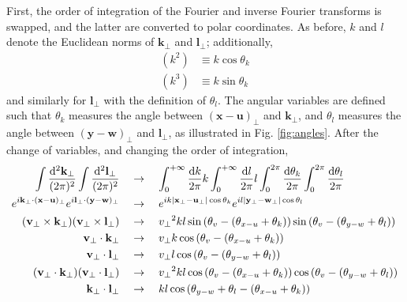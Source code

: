 First, the order of integration of the Fourier and inverse Fourier transforms is swapped, and the latter are converted to polar coordinates. As before, $k$ and $l$ denote the Euclidean norms of $\mathbf{k}_\perp$ and $\mathbf{l}_\perp$; additionally,
\begin{subequations}
\begin{align}
(k^2) & \equiv k \cos \theta_k \\
(k^3) & \equiv k \sin \theta_k
\end{align}
\end{subequations}
and similarly for $\mathbf{l}_\perp$ with the definition of $\theta_l$. The angular variables are defined such that $\theta_k$ measures the angle between $(\mathbf{x}-\mathbf{u})_\perp$ and $\mathbf{k}_\perp$, and $\theta_l$ measures the angle between $(\mathbf{y}-\mathbf{w})_\perp$ and $\mathbf{l}_\perp$, as illustrated in Fig. \ref{fig:angles}. After the change of variables, and changing the order of integration,
\begin{subequations}
\begin{align}
	\int \frac{\mathop{}\!\mathrm{d}^2 \mathbf{k_\perp}}{(2\pi)^2}
\int \frac{\mathop{}\!\mathrm{d}^2 \mathbf{l}_\perp}{(2\pi)^2} \quad & \to
\quad \int_0^{+\infty} \frac{\mathop{}\!\mathrm{d} k}{2\pi} k
\int_0^{+\infty} \frac{\mathop{}\!\mathrm{d} l}{2\pi} l
\int_{0}^{2\pi} \frac{\mathop{}\!\mathrm{d} \theta_k}{2 \pi} \int_{0}^{2\pi} \frac{\mathop{}\!\mathrm{d} \theta_l}{2 \pi} \\
e^{i \mathbf{k}_\perp \cdot (\mathbf{x} - \mathbf{u})_\perp}
e^{i \mathbf{l}_\perp \cdot (\mathbf{y} - \mathbf{w})_\perp} \quad &\to \quad 
e^{i k |\mathbf{x}_\perp - \mathbf{u}_\perp| \cos{\theta_k}}
e^{i l |\mathbf{y}_\perp - \mathbf{w}_\perp| \cos{\theta_l}}\\
(\mathbf{v}_\perp \times \mathbf{k}_\perp) (\mathbf{v}_\perp \times \mathbf{l}_\perp) \quad & \to \quad 
{v_\perp}^2 k l \sin \left(\theta_v - (\theta_{x-u} + \theta_k) \right) \sin \left(\theta_v - (\theta_{y-w} + \theta_l) \right)\\
\mathbf{v}_\perp \cdot \mathbf{k}_\perp  \quad & \to \quad 
 v_\perp k \cos \left(\theta_v - (\theta_{x-u} + \theta_k) \right)\\
\mathbf{v}_\perp \cdot \mathbf{l}_\perp  \quad & \to \quad 
 v_\perp l \cos \left(\theta_v - (\theta_{y-w} + \theta_l) \right) \\
(\mathbf{v}_\perp \cdot \mathbf{k}_\perp) (\mathbf{v}_\perp \cdot \mathbf{l}_\perp)  \quad & \to \quad 
{v_\perp}^2 k l \cos \left(\theta_v - (\theta_{x-u} + \theta_k) \right) \cos \left(\theta_v - (\theta_{y-w} + \theta_l) \right)\\
\mathbf{k}_\perp \cdot \mathbf{l}_\perp  \quad & \to \quad 
k l \cos \left( \theta_{y-w} + \theta_l - \left(\theta_{x-u} + \theta_k \right) \right)
\end{align}
\end{subequations}


